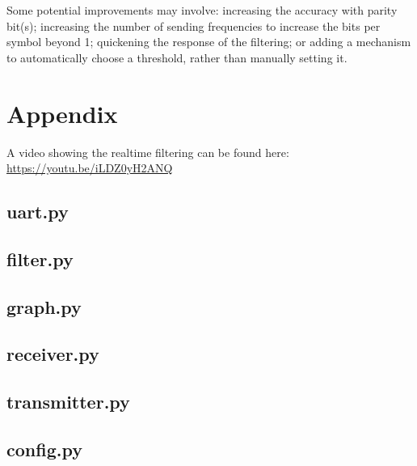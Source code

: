 \documentclass{article}
\begin{document}
\begin{multicols}{2}
Some potential improvements may involve: increasing the accuracy with parity bit(s); increasing the number of sending frequencies to increase the bits per symbol beyond 1; quickening the response of the filtering; or adding a mechanism to automatically choose a threshold, rather than manually setting it.  

\end{multicols}
\pagebreak

\section{Appendix}
A video showing the realtime filtering can be found here: \href{https://youtu.be/iLDZ0yH2ANQ}{https://youtu.be/iLDZ0yH2ANQ}

\subsection{uart.py}


\subsection{filter.py}


\subsection{graph.py}


\subsection{receiver.py}


\subsection{transmitter.py}


\subsection{config.py}

\end{document}
